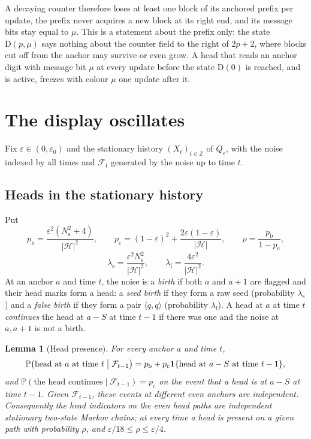 \documentclass[11pt]{article}
\theoremstyle{plain}
\newtheorem{lemma}[theorem]{Lemma}
\theoremstyle{definition}
\theoremstyle{remark}
\newcommand{\Z}{\mathbb Z}
\newcommand{\Prob}{\mathbb P}
\newcommand{\eps}{\varepsilon}
\newcommand{\ind}{\mathbf 1}
\newcommand{\Lh}[1]{\langle #1}
\newcommand{\Rh}[1]{#1\rangle}
\newcommand{\Hs}{\mathcal H}
\newcommand{\cF}{\mathcal F}
\begin{document}
A decaying counter therefore loses at least one block of its anchored prefix per update, the prefix never acquires a new block at its right end, and its message bits stay equal to $\mu$. This is a statement about the prefix only: the state $\mathrm D(p,\mu)$ says nothing about the counter field to the right of $2p+2$, where blocks cut off from the anchor may survive or even grow. A head that reads an anchor digit with message bit $\mu$ at every update before the state $\mathrm D(0)$ is reached, and is active, freezes with colour $\mu$ one update after it.

\section{The display oscillates}\label{sec:display}

Fix $\eps\in(0,\eps_0)$ and the stationary history $(X_t)_{t\in\Z}$ of $Q_\eps$, with the noise indexed by all times and $\cF_t$ generated by the noise up to time $t$.

\subsection{Heads in the stationary history}

Put
\[
p_{\mathrm b}=\frac{\eps^2(N_{\mathrm s}^2+4)}{|\Hs|^2},\qquad p_{\mathrm c}=(1-\eps)^2+\frac{2\eps(1-\eps)}{|\Hs|},\qquad \rho=\frac{p_{\mathrm b}}{1-p_{\mathrm c}},
\]
\[
\lambda_{\mathrm s}=\frac{\eps^2N_{\mathrm s}^2}{|\Hs|^2},\qquad \lambda_{\mathrm f}=\frac{4\eps^2}{|\Hs|^2}.
\]
At an anchor $a$ and time $t$, the noise is a \emph{birth} if both $a$ and $a+1$ are flagged and their head marks form a head: a \emph{seed birth} if they form a raw seed (probability $\lambda_{\mathrm s}$) and a \emph{false birth} if they form a pair $\Lh q,\Rh q$ (probability $\lambda_{\mathrm f}$). A head at $a$ at time $t$ \emph{continues} the head at $a-S$ at time $t-1$ if there was one and the noise at $a,a+1$ is not a birth.

\begin{lemma}[Head presence]\label{lem:presence}
For every anchor $a$ and time $t$,
\[
\Prob\bigl(\text{head at }a\text{ at time }t\bigm|\cF_{t-1}\bigr)=p_{\mathrm b}+p_{\mathrm c}\ind\{\text{head at }a-S\text{ at time }t-1\},
\]
and $\Prob(\text{the head continues}\mid\cF_{t-1})=p_{\mathrm c}$ on the event that a head is at $a-S$ at time $t-1$. Given $\cF_{t-1}$, these events at different even anchors are independent. Consequently the head indicators on the even head paths are independent stationary two-state Markov chains; at every time a head is present on a given path with probability $\rho$, and $\eps/18\le\rho\le\eps/4$.
\end{lemma}
\end{document}
